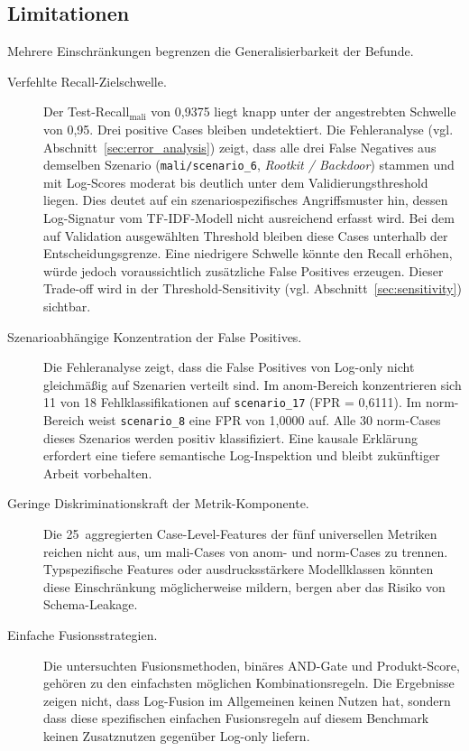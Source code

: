 \subsection{Limitationen}

Mehrere Einschränkungen begrenzen die Generalisierbarkeit der Befunde.

\begin{description}
  \item[Verfehlte Recall-Zielschwelle.] Der Test-Recall$_{\text{mali}}$ von
0{,}9375 liegt knapp unter der angestrebten Schwelle von 0{,}95. Drei
positive Cases bleiben undetektiert. Die Fehleranalyse (vgl. Abschnitt~\ref{sec:error_analysis})
zeigt, dass alle drei False Negatives aus demselben Szenario
(\texttt{mali/scenario\_6}, \emph{Rootkit / Backdoor}) stammen und mit
Log-Scores moderat bis deutlich unter dem Validierungsthreshold liegen.
Dies deutet auf ein szenariospezifisches Angriffsmuster hin, dessen Log-Signatur
vom TF-IDF-Modell nicht ausreichend erfasst wird. Bei dem auf Validation
ausgewählten Threshold bleiben diese Cases unterhalb der Entscheidungsgrenze.
Eine niedrigere Schwelle könnte den Recall erhöhen, würde jedoch voraussichtlich
zusätzliche False Positives erzeugen. Dieser Trade-off wird in der
Threshold-Sensitivity (vgl. Abschnitt~\ref{sec:sensitivity}) sichtbar.

  \item[Szenarioabhängige Konzentration der False Positives.] Die Fehleranalyse
zeigt, dass die False Positives von Log-only nicht gleichmäßig auf Szenarien
verteilt sind. Im anom-Bereich konzentrieren sich 11 von 18 Fehlklassifikationen
auf \texttt{scenario\_17} (FPR = 0{,}6111). Im norm-Bereich weist
\texttt{scenario\_8} eine FPR von 1{,}0000 auf. Alle 30 norm-Cases dieses
Szenarios werden positiv klassifiziert. Eine kausale Erklärung erfordert eine
tiefere semantische Log-Inspektion und bleibt zukünftiger Arbeit vorbehalten.

  \item[Geringe Diskriminationskraft der Metrik-Komponente.] Die 25~aggregierten
Case-Level-Features der fünf universellen Metriken reichen nicht aus, um
mali-Cases von anom- und norm-Cases zu trennen. Typspezifische Features oder
ausdrucksstärkere Modellklassen könnten diese Einschränkung möglicherweise
mildern, bergen aber das Risiko von Schema-Leakage.

  \item[Einfache Fusionsstrategien.] Die untersuchten Fusionsmethoden,
binäres AND-Gate und Produkt-Score, gehören zu den einfachsten möglichen
Kombinationsregeln. Die Ergebnisse zeigen nicht, dass Log-Fusion im
Allgemeinen keinen Nutzen hat, sondern dass diese spezifischen einfachen
Fusionsregeln auf diesem Benchmark keinen Zusatznutzen gegenüber Log-only
liefern.


\end{description}
